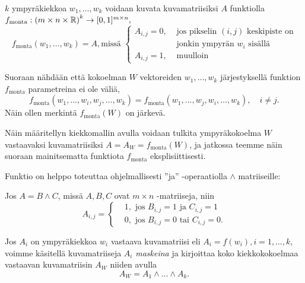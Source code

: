 \begin{maar}
    $k$ ympyräkiekkoa $w_1, \dots, w_k$ voidaan kuvata kuvamatriisiksi $A$ funktiolla $f_{\text{monta}} : \left( m \times n \times \mathbb{R} \right)^k \to [0, 1]^{m \times n},$
    \begin{equation*}
        f_{\text{monta}}(w_1, \dots, w_k) = A, \text{missä }
        \left\{
        \begin{aligned}
            A_{i,j} = 0, &\text{ jos pikselin $(i,j)$ keskipiste on}\\
             & \text{ jonkin ympyrän $w_i$ sisällä}
            \\
            A_{i,j} = 1, &\text{ muulloin}
        \end{aligned}
        \right.
    \end{equation*}
\end{maar}
Suoraan nähdään että kokoelman $W$ vektoreiden $w_1, \dots, w_k$ järjestyksellä funktion $f_{\text{monta}}$ parametreina ei ole väliä,
\begin{equation}
    f_{\text{monta}}(w_1, \dots, w_i, w_j, \dots, w_k) = f_{\text{monta}}(w_1, \dots, w_j, w_i, \dots, w_k), \quad i \not = j.
\end{equation}
Näin ollen merkintä $f_{\text{monta}}(W)$ on järkevä.

Näin määritellyn kiekkomallin avulla voidaan tulkita ympyräkokoelma $W$ vastaavaksi kuvamatriisiksi $A = A_W = f_{\text{monta}}(W)$,
ja jatkossa teemme näin suoraan mainitsematta funktiota $f_{\text{monta}}$ eksplisiittisesti.

Funktio on helppo toteuttaa ohjelmallisesti ''ja'' -operaatiolla $\wedge$ matriiseille:
\begin{maar}
Jos $A = B \wedge C$, missä $A, B, C$ ovat $m \times n$ -matriiseja, niin
\begin{equation}
    A_{i,j} =
    \begin{cases}
        &1, \text{ jos } B_{i,j} = 1 \text{ ja } C_{i,j} = 1 \\
        &0, \text{ jos } B_{i,j} = 0 \text{ tai } C_{i,j} = 0.
    \end{cases}
\end{equation}
\end{maar}

Jos $A_i$ on ympyräkiekkoa $w_i$ vastaava kuvamatriisi eli $A_i = f(w_i), i = 1, \dots, k$, voimme käsitellä kuvamatriiseja $A_i$ \emph{maskeina} ja kirjoittaa koko kiekkokokoelmaa vastaavan kuvamatriisin $A_W$ niiden avulla
    \begin{equation}
        A_W = A_1 \wedge \dots \wedge A_k.
    \end{equation}

